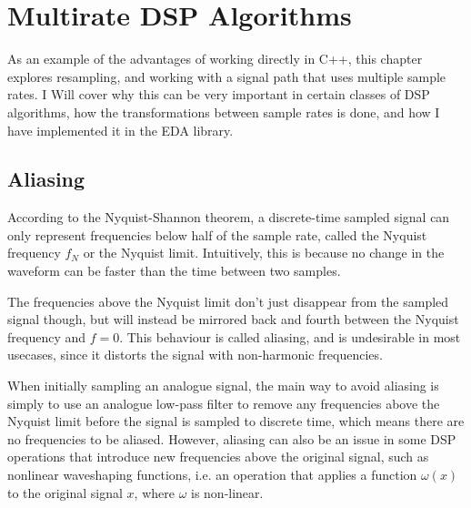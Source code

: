 \chapter{Multirate DSP Algorithms}

As an example of the advantages of working directly in C++, this chapter explores resampling, and working
with a signal path that uses multiple sample rates. I Will cover why this can be very important in certain
classes of DSP algorithms, how the transformations between sample rates is done, and how I have implemented
it in the EDA library.

\section{Aliasing}

According to the Nyquist-Shannon theorem\autocite{shannon49}, a discrete-time sampled signal can only
represent frequencies below half of the sample rate, called the Nyquist frequency $f_N$ or
the Nyquist limit. Intuitively, this is because no change in the waveform can be faster than the time between
two samples.

The frequencies above the Nyquist limit don't just disappear from the sampled signal though, but will instead
be mirrored back and fourth between the Nyquist frequency and $f = 0$. This behaviour is
called aliasing, and is undesirable in most usecases, since it distorts the signal with non-harmonic
frequencies.

When initially sampling an analogue signal, the main way to avoid aliasing is simply to use an analogue
low-pass filter to remove any frequencies above the Nyquist limit before the signal is sampled to discrete
time\autocite{an699},  which means there are no frequencies to be aliased. However, aliasing can also
be an issue in some DSP operations that introduce new frequencies above the original signal, such as
nonlinear waveshaping functions, i.e. an operation that applies a function $\omega(x)$ to the
original signal $x$, where $\omega$ is non-linear.

